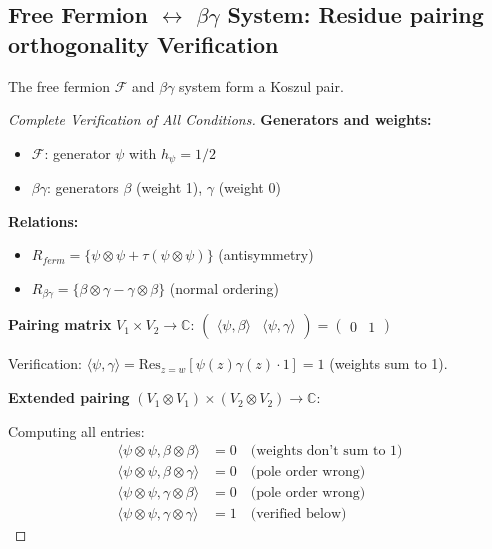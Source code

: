 \subsection{Free Fermion $\leftrightarrow$ $\beta\gamma$ System: Residue pairing orthogonality Verification}

\begin{theorem}
The free fermion $\mathcal{F}$ and $\beta\gamma$ system form a Koszul pair.
\end{theorem}

\begin{proof}[Complete Verification of All Conditions]
\textbf{Generators and weights:}
\begin{itemize}
\item $\mathcal{F}$: generator $\psi$ with $h_\psi = 1/2$
\item $\beta\gamma$: generators $\beta$ (weight 1), $\gamma$ (weight 0)
\end{itemize}

\textbf{Relations:}
\begin{itemize}
\item $R_{ferm} = \{\psi \otimes \psi + \tau(\psi \otimes \psi)\}$ (antisymmetry)
\item $R_{\beta\gamma} = \{\beta \otimes \gamma - \gamma \otimes \beta\}$ (normal ordering)
\end{itemize}

\textbf{Pairing matrix} $V_1 \times V_2 \to \mathbb{C}$:
$\begin{pmatrix}
\langle\psi, \beta\rangle & \langle\psi, \gamma\rangle
\end{pmatrix} = \begin{pmatrix}
0 & 1
\end{pmatrix}$

Verification: $\langle\psi, \gamma\rangle = \text{Res}_{z=w}[\psi(z)\gamma(z) \cdot 1] = 1$ (weights sum to 1).

\textbf{Extended pairing} $(V_1 \otimes V_1) \times (V_2 \otimes V_2) \to \mathbb{C}$:

Computing all entries:
\begin{align}
\langle\psi \otimes \psi, \beta \otimes \beta\rangle &= 0 \quad \text{(weights don't sum to 1)}\\
\langle\psi \otimes \psi, \beta \otimes \gamma\rangle &= 0 \quad \text{(pole order wrong)}\\
\langle\psi \otimes \psi, \gamma \otimes \beta\rangle &= 0 \quad \text{(pole order wrong)}\\
\langle\psi \otimes \psi, \gamma \otimes \gamma\rangle &= 1 \quad \text{(verified below)}
\end{align}


\end{proof}
